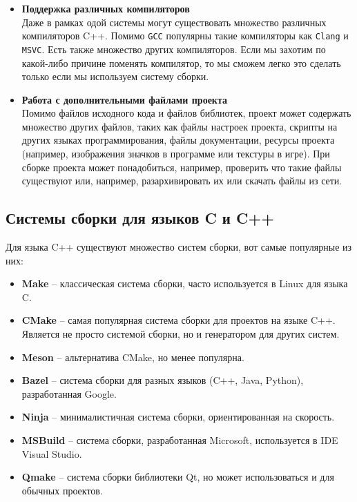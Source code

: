 \documentclass{article}
\begin{document}
\begin{itemize}
\item \textbf{Поддержка различных компиляторов}\\
Даже в рамках одой системы могут существовать множество различных компиляторов C++. Помимо \texttt{GCC} популярны такие компиляторы как \texttt{Clang} и \texttt{MSVC}. Есть также множество других компиляторов. Если мы захотим по какой-либо причине поменять компилятор, то мы сможем легко это сделать только если мы используем систему сборки.  

\item \textbf{Работа с дополнительными файлами проекта}\\
Помимо файлов исходного кода и файлов библиотек, проект может содержать множество других файлов, таких как файлы настроек проекта, скрипты на других языках программирования, файлы документации, ресурсы проекта (например, изображения значков в программе или текстуры в игре). При сборке проекта может понадобиться, например, проверить что такие файлы существуют или, например, разархивировать их или скачать файлы из сети.
\end{itemize}


\subsection*{Системы сборки для языков C и C++}
Для языка C++ существуют множество систем сборки, вот самые популярные из них:
\begin{itemize}
\item \textbf{Make} -- классическая система сборки, часто используется в Linux для языка C.
\item \textbf{CMake} -- самая популярная система сборки для проектов на языке C++.\\ Является не просто системой сборки, но и генератором для других систем.
\item \textbf{Meson} -- альтернатива CMake, но менее популярна.
\item \textbf{Bazel} -- система сборки для разных языков (C++, Java, Python), разработанная Google.
\item \textbf{Ninja} -- минималистичная система сборки, ориентированная на скорость.
\item \textbf{MSBuild} -- система сборки, разработанная Microsoft, используется в IDE Visual Studio.

\item \textbf{Qmake} -- система сборки библиотеки Qt, но может использоваться и для обычных проектов.
\end{itemize}
\end{document}
